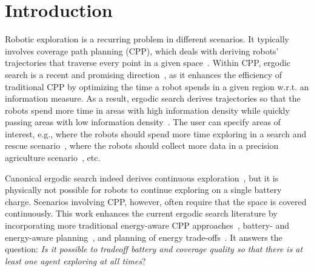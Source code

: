 \documentclass[letterpaper,10pt,conference,twoside]{IEEEtran}
\theoremstyle{definition}
\begin{document}
\section{Introduction}
\noindent
Robotic exploration is a recurring problem in different scenarios. It typically involves coverage path planning (CPP), which deals with deriving robots' trajectories that traverse every point in a given space~\cite{choset2001coverage,galceran2013survey,cabreira2019survey}. Within CPP, ergodic search is a recent and promising direction~\cite{abraham2021ergodic,miller2016ergodic,dressel2018optimality,torre2016ergodic,shetty2022ergodic,prabhakar2020ergodic,coffin2022multi,lerch2023safety,abraham2018decentralized,patel2021multi,dong2023time,abraham2017ergodic,rao2023multi,ayvali2017ergodic}, as it enhances the efficiency of traditional CPP by optimizing the time a robot spends in a given region w.r.t. an information measure. As a result, ergodic search derives trajectories so that the robots spend more time in areas with high information density while quickly passing areas with low information density~\cite{mathew2011metrics,%
patel2021multi}. The user can specify areas of interest, e.g., where the robots should spend more time exploring in a search and rescue scenario~\cite{dong2023time}, where the robots should collect more data in a precision agriculture scenario~\cite{rao2023multi}, etc.

Canonical ergodic search indeed derives continuous exploration~\cite{%
miller2013trajectory,miller2016ergodic,abraham2017ergodic}, but it is physically not possible for robots to continue exploring on a single battery charge. 
Scenarios involving CPP, however, often require that the space is covered continuously.
This work enhances the current ergodic search literature by incorporating more traditional energy-aware CPP approaches~\cite{difranco2015energy,difranco2016coverage,shnaps2016online,cabreira2018energy,wei2018coverage,jensen2021near}, battery- and energy-aware planning~\cite{mei2004energy,mei2005case,kim2005energy,seewald2022energy}, and planning of energy trade-offs~\cite{ondruska2015scheduled,sudhakar2020balancing}. It answers the question: \textit{Is it possible to tradeoff battery and coverage quality so that there is at least one agent exploring %
at all times}?
\end{document}
